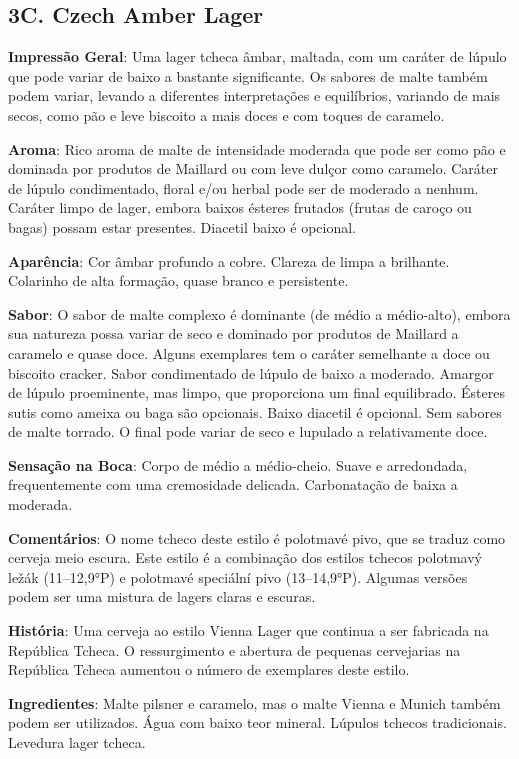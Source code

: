 \subsection*{3C. Czech Amber Lager}
\textbf{Impressão Geral}: Uma lager tcheca âmbar, maltada, com um caráter de lúpulo que pode variar de baixo a bastante significante. Os sabores de malte também podem variar, levando a diferentes interpretações e equilíbrios, variando de mais secos, como pão e leve biscoito a mais doces e com toques de caramelo.

\textbf{Aroma}: Rico aroma de malte de intensidade moderada que pode ser como pão e dominada por produtos de Maillard ou com leve dulçor como caramelo. Caráter de lúpulo condimentado, floral e/ou herbal pode ser de moderado a nenhum. Caráter limpo de lager, embora baixos ésteres frutados (frutas de caroço ou bagas) possam estar presentes. Diacetil baixo é opcional.

\textbf{Aparência}: Cor âmbar profundo a cobre. Clareza de limpa a brilhante. Colarinho de alta formação, quase branco e persistente.

\textbf{Sabor}: O sabor de malte complexo é dominante (de médio a médio-alto), embora sua natureza possa variar de seco e dominado por produtos de Maillard a caramelo e quase doce. Alguns exemplares tem o caráter semelhante a doce ou biscoito cracker. Sabor condimentado de lúpulo de baixo a moderado. Amargor de lúpulo proeminente, mas limpo, que proporciona um final equilibrado. Ésteres sutis como ameixa ou baga são opcionais. Baixo diacetil é opcional. Sem sabores de malte torrado. O final pode variar de seco e lupulado a relativamente doce.

\textbf{Sensação na Boca}: Corpo de médio a médio-cheio. Suave e arredondada, frequentemente com uma cremosidade delicada. Carbonatação de baixa a moderada.

\textbf{Comentários}: O nome tcheco deste estilo é polotmavé pivo, que se traduz como cerveja meio escura. Este estilo é a combinação dos estilos tchecos polotmavý ležák (11–12,9°P) e polotmavé speciální pivo (13–14,9°P). Algumas versões podem ser uma mistura de lagers claras e escuras.

\textbf{História}: Uma cerveja ao estilo Vienna Lager que continua a ser fabricada na República Tcheca. O ressurgimento e abertura de pequenas cervejarias na República Tcheca aumentou o número de exemplares deste estilo.

\textbf{Ingredientes}: Malte pilsner e caramelo, mas o malte Vienna e Munich também podem ser utilizados. Água com baixo teor mineral. Lúpulos tchecos tradicionais. Levedura lager tcheca.

